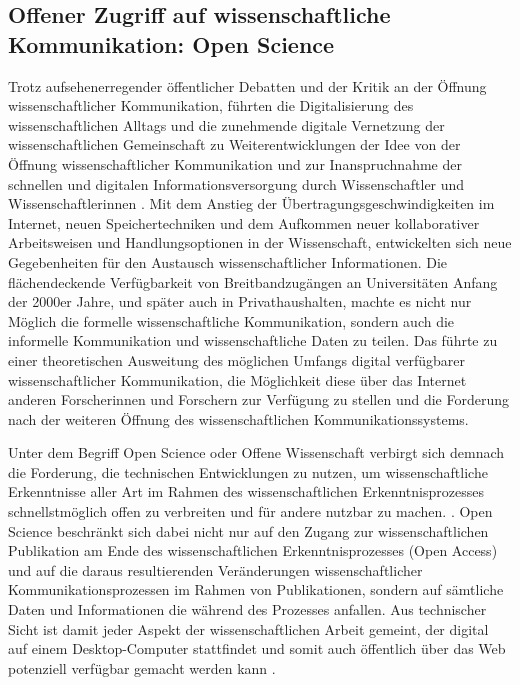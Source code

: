 \subsection{Offener Zugriff auf wissenschaftliche Kommunikation: Open Science}

Trotz aufsehenerregender öffentlicher Debatten und der Kritik an der Öffnung wissenschaftlicher Kommunikation, führten die Digitalisierung des wissenschaftlichen Alltags und die zunehmende digitale Vernetzung der wissenschaftlichen Gemeinschaft zu Weiterentwicklungen der Idee von der Öffnung wissenschaftlicher Kommunikation und zur Inanspruchnahme der schnellen und digitalen Informationsversorgung durch Wissenschaftler und Wissenschaftlerinnen \cite{winkler_2011_anforderungen}. Mit dem Anstieg der Übertragungsgeschwindigkeiten im Internet, neuen Speichertechniken und dem Aufkommen neuer kollaborativer Arbeitsweisen und Handlungsoptionen in der Wissenschaft, entwickelten sich neue Gegebenheiten für den Austausch wissenschaftlicher Informationen. Die flächendeckende Verfügbarkeit von Breitbandzugängen an Universitäten Anfang der 2000er Jahre, und später auch in Privathaushalten, machte es nicht nur Möglich die formelle wissenschaftliche  Kommunikation, sondern auch die informelle Kommunikation und wissenschaftliche Daten zu teilen. Das führte zu einer theoretischen Ausweitung des möglichen Umfangs digital verfügbarer wissenschaftlicher Kommunikation, die Möglichkeit diese über das Internet anderen Forscherinnen und Forschern zur Verfügung zu stellen und die Forderung nach der weiteren Öffnung des wissenschaftlichen Kommunikationssystems.

Unter dem Begriff Open Science oder Offene Wissenschaft verbirgt sich demnach die Forderung, die technischen Entwicklungen zu nutzen, um wissenschaftliche Erkenntnisse aller Art im Rahmen des wissenschaftlichen Erkenntnisprozesses schnellstmöglich offen zu verbreiten und für andere nutzbar zu machen. \cite{stafford_2010_science}. Open Science beschränkt sich dabei nicht nur auf den Zugang zur wissenschaftlichen Publikation am Ende des wissenschaftlichen Erkenntnisprozesses (Open Access) und auf die daraus resultierenden Veränderungen wissenschaftlicher Kommunikationsprozessen im Rahmen von Publikationen, sondern auf sämtliche Daten und Informationen die während des Prozesses anfallen. Aus technischer Sicht ist damit jeder Aspekt der wissenschaftlichen Arbeit gemeint, der digital auf einem Desktop-Computer stattfindet und somit auch öffentlich über das Web potenziell verfügbar gemacht werden kann \cite{mietchen2012wissenschaft}.

